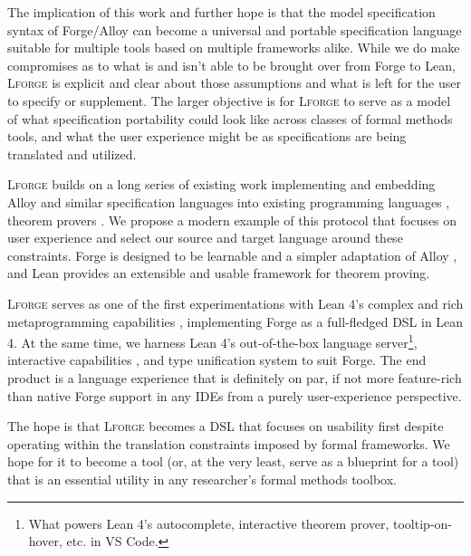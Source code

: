 The implication of this work and further hope is that the model specification syntax of Forge/Alloy can become a universal and portable specification language suitable for multiple tools based on multiple frameworks alike. While we do make compromises as to what is and isn't able to be brought over from Forge to Lean, \textsc{Lforge} is explicit and clear about those assumptions and what is left for the user to specify or supplement. The larger objective is for \textsc{Lforge} to serve as a model of what specification portability could look like across classes of formal methods tools, and what the user experience might be as specifications are being translated and utilized. 

\textsc{Lforge} builds on a long series of existing work implementing and embedding Alloy and similar specification languages into existing programming languages \cite{milicevic2010executable,milicevic2014alpha,korner2022embedding,malik2010translating,mikhailov2002approach}, theorem provers \cite{arkoudas2004integrating,st2023comparison,krings2018translation}. We propose a modern example of this protocol that focuses on user experience and select our source and target language around these constraints. Forge is designed to be learnable and a simpler adaptation of Alloy \cite{ngpdbccdlrrvwwk-oopsla-2024}, and Lean provides an extensible \cite{nawrocki2023extensible,ullrich2023extensible} and usable \cite{ayers2021graphical} framework for theorem proving. 

\textsc{Lforge} serves as one of the first experimentations with Lean 4's complex and rich metaprogramming capabilities \cite{metaprogramming}, implementing Forge as a full-fledged DSL in Lean 4. At the same time, we harness Lean 4's out-of-the-box language server\footnote{What powers Lean 4's autocomplete, interactive theorem prover, tooltip-on-hover, etc. in VS Code.}, interactive capabilities \cite{nawrocki2023extensible}, and type unification system to suit Forge. The end product is a language experience that is definitely on par, if not more feature-rich than native Forge support in any IDEs from a purely user-experience perspective. 

The hope is that \textsc{Lforge} becomes a DSL that focuses on usability first despite operating within the translation constraints imposed by formal frameworks. We hope for it to become a tool (or, at the very least, serve as a blueprint for a tool) that is an essential utility in any researcher's formal methods toolbox. 